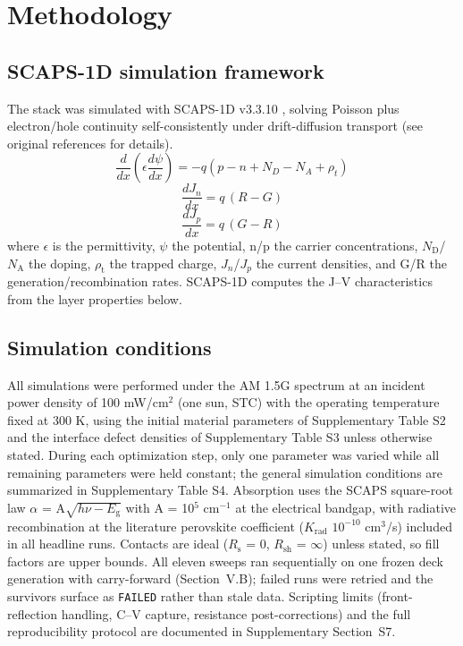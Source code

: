 \documentclass[aip,amsmath,amssymb,preprint]{revtex4-2}
\begin{document}
\section{Methodology}

\subsection{SCAPS-1D simulation framework}
The stack was simulated with SCAPS-1D v3.3.10 \cite{r19,r20}, solving Poisson plus electron/hole continuity self-consistently under drift-diffusion transport (see original references for details).
\begin{equation}\label{eq:poisson}
\frac{d}{dx}\left(\epsilon\frac{d\psi}{dx}\right) =
-q\left(p-n+N_{D}-N_{A}+\rho_{t}\right)
\end{equation}
\begin{equation}\label{eq:electron}
\frac{dJ_{n}}{dx} = q\,(R-G)
\end{equation}
\begin{equation}\label{eq:hole}
\frac{dJ_{p}}{dx} = q\,(G-R)
\end{equation}
where $\epsilon$ is the permittivity, $\psi$ the potential, n/p the carrier concentrations, $N_{\mathrm{D}}$/$N_{\mathrm{A}}$ the doping, $\rho_{\mathrm{t}}$ the trapped charge, $J_{n}$/$J_{p}$ the current densities, and G/R the generation/recombination rates. SCAPS-1D computes the J--V characteristics from the layer properties below.

\subsection{Simulation conditions}
All simulations were performed under the AM 1.5G spectrum at an incident power density of 100 mW/cm$^{2}$ (one sun, STC) with the operating temperature fixed at 300 K, using the initial material parameters of Supplementary Table S2 and the interface defect densities of Supplementary Table S3 unless otherwise stated. During each optimization step, only one parameter was varied while all remaining parameters were held constant; the general simulation conditions are summarized in Supplementary Table S4. Absorption uses the SCAPS square-root law $\alpha$ = A$\sqrt{h\nu-E_{\mathrm{g}}}$ with A = 10$^{5}$ cm$^{-1}$ at the electrical bandgap, with radiative recombination at the literature perovskite coefficient ($K_{\mathrm{rad}}$ $10^{-10}$ cm$^{3}$/s) included in all headline runs. Contacts are ideal ($R_{\mathrm{s}}$ = 0, $R_{\mathrm{sh}}$ = $\infty$) unless stated, so fill factors are upper bounds. All eleven sweeps ran sequentially on one frozen deck generation with carry-forward (Section~V.B); failed runs were retried and the survivors surface as \texttt{FAILED} rather than stale data. Scripting limits (front-reflection handling, C--V capture, resistance post-corrections) and the full reproducibility protocol are documented in Supplementary Section~S7.
\end{document}
